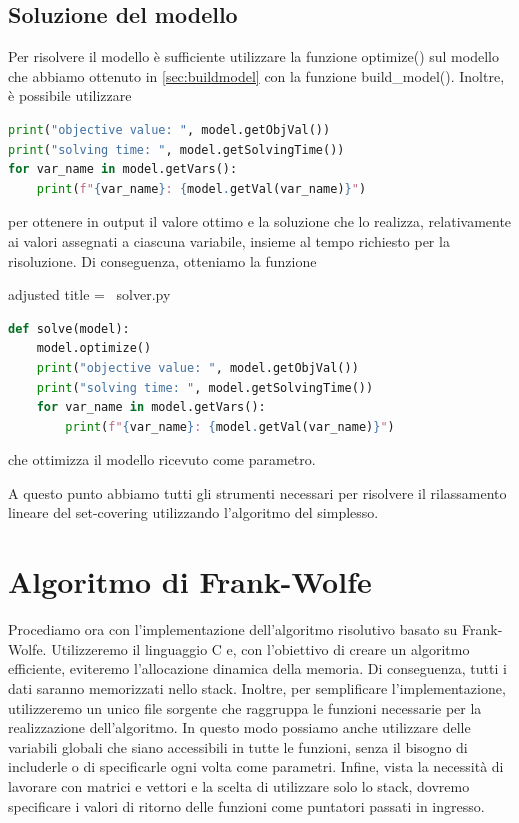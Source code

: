\subsection{Soluzione del modello}
Per risolvere il modello è sufficiente utilizzare la funzione {\jbm optimize()} sul modello che abbiamo ottenuto in
\ref{sec:buildmodel} con la funzione {\jbm build\_model()}. Inoltre, è possibile utilizzare
\begin{inline}
\begin{lstlisting}[style = style2, language=python]
print("objective value: ", model.getObjVal())
print("solving time: ", model.getSolvingTime())
for var_name in model.getVars():
    print(f"{var_name}: {model.getVal(var_name)}")
\end{lstlisting}
\end{inline}
\noindent
per ottenere in output il valore ottimo e la soluzione che lo realizza, relativamente ai valori assegnati a ciascuna
variabile, insieme al tempo richiesto per la risoluzione. Di conseguenza, otteniamo la funzione
\begin{code}{adjusted title = {\pyicon\ solver.py}}
\begin{lstlisting}[language=python, style = style, caption={Soluzione del modello con l'algoritmo del simplesso.}]
def solve(model):
    model.optimize()
    print("objective value: ", model.getObjVal())
    print("solving time: ", model.getSolvingTime())
    for var_name in model.getVars():
        print(f"{var_name}: {model.getVal(var_name)}")
\end{lstlisting}
\end{code}
\noindent
che ottimizza il modello ricevuto come parametro.

A questo punto abbiamo tutti gli strumenti necessari per risolvere il rilassamento lineare del set-covering utilizzando
l'algoritmo del simplesso.

\section{Algoritmo di Frank-Wolfe}
Procediamo ora con l'implementazione dell'algoritmo risolutivo basato su Frank-Wolfe. Utilizzeremo il linguaggio C e,
con l'obiettivo di creare un algoritmo efficiente, eviteremo l'allocazione dinamica della memoria. Di conseguenza, tutti
i dati saranno memorizzati nello stack. Inoltre, per semplificare l'implementazione, utilizzeremo un unico file sorgente
che raggruppa le funzioni necessarie per la realizzazione dell'algoritmo. In questo modo possiamo anche utilizzare delle
variabili globali che siano accessibili in tutte le funzioni, senza il bisogno di includerle o di specificarle ogni volta come
parametri. Infine, vista la necessità di lavorare con matrici e vettori e la scelta di utilizzare solo lo stack, dovremo
specificare i valori di ritorno delle funzioni come puntatori passati in ingresso.

